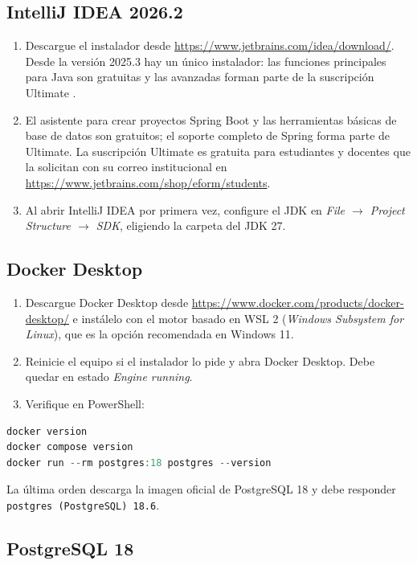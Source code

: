 \subsection{IntelliJ IDEA 2026.2}

\begin{enumerate}
	\item Descargue el instalador desde \url{https://www.jetbrains.com/idea/download/}. Desde la versión 2025.3 hay un único instalador: las funciones principales para Java son gratuitas y las avanzadas forman parte de la suscripción Ultimate \cite{jetbrains2025unified}.
	\item El asistente para crear proyectos Spring Boot y las herramientas básicas de base de datos son gratuitos; el soporte completo de Spring forma parte de Ultimate. La suscripción Ultimate es gratuita para estudiantes y docentes que la solicitan con su correo institucional en \url{https://www.jetbrains.com/shop/eform/students}.
	\item Al abrir IntelliJ IDEA por primera vez, configure el JDK en \emph{File $\rightarrow$ Project Structure $\rightarrow$ SDK}, eligiendo la carpeta del JDK 27.
\end{enumerate}

\subsection{Docker Desktop}

\begin{enumerate}
	\item Descargue Docker Desktop desde \url{https://www.docker.com/products/docker-desktop/} e instálelo con el motor basado en WSL 2 (\emph{Windows Subsystem for Linux}), que es la opción recomendada en Windows 11.
	\item Reinicie el equipo si el instalador lo pide y abra Docker Desktop. Debe quedar en estado \emph{Engine running}.
	\item Verifique en PowerShell:
\end{enumerate}

\begin{lstlisting}[language=powershell,numbers=none]
docker version
docker compose version
docker run --rm postgres:18 postgres --version
\end{lstlisting}

La última orden descarga la imagen oficial de PostgreSQL 18 y debe responder \texttt{postgres (PostgreSQL) 18.6}.

\subsection{PostgreSQL 18}

